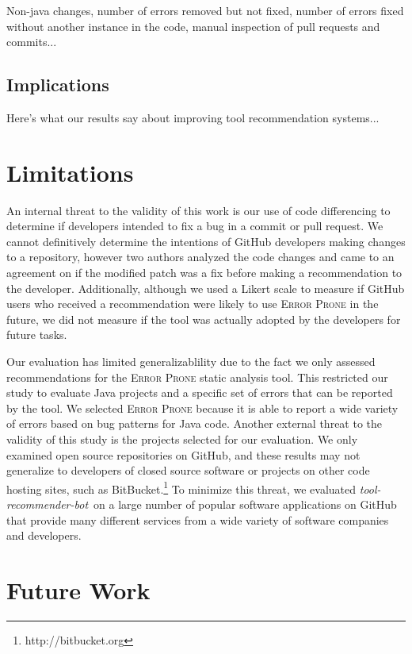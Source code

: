 \documentclass[sigconf,review,anonymous]{acmart}
\newcommand{\tool}{\textsl{tool-recommender-bot}}
\begin{document}
Non-java changes, number of errors removed but not fixed, number of errors fixed without another instance in the code, manual inspection of pull requests and commits...

\subsection{Implications}

Here's what our results say about improving tool recommendation systems...

\section{Limitations}

An internal threat to the validity of this work is our use of code differencing to determine if developers intended to fix a bug in a commit or pull request. We cannot definitively determine the intentions of GitHub developers making changes to a repository, however two authors analyzed the code changes and came to an agreement on if the modified patch was a fix before making a recommendation to the developer. Additionally, although we used a Likert scale to measure if GitHub users who received a recommendation were likely to use \textsc{Error Prone} in the future, we did not measure if the tool was actually adopted by the developers for future tasks.

Our evaluation has limited generalizablility due to the fact we only assessed recommendations for the \textsc{Error Prone} static analysis tool. This restricted our study to evaluate Java projects and a specific set of errors that can be reported by the tool. We selected \textsc{Error Prone} because it is able to report a wide variety of errors based on bug patterns for Java code. Another external threat to the validity of this study is the projects selected for our evaluation. We only examined open source repositories on GitHub, and these results may not generalize to developers of closed source software or projects on other code hosting sites, such as BitBucket.\footnote{http://bitbucket.org} To minimize this threat, we evaluated \tool~on a large number of popular software applications on GitHub that provide many different services from a wide variety of software companies and developers. 

\section{Future Work}
\end{document}
